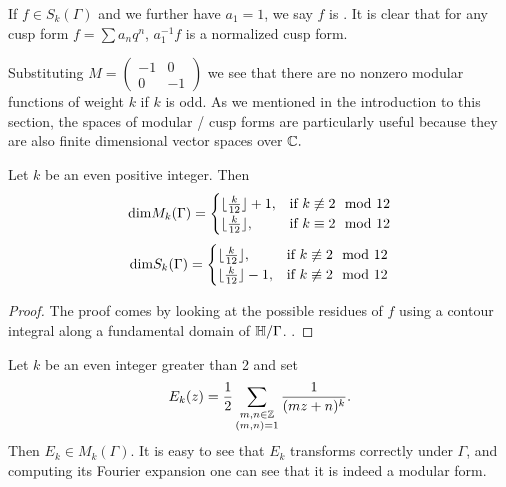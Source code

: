 \documentclass[12pt, a4paper]{report}
\begin{document}
\begin{remark}
  If $f \in S_k(\Gamma)$ and we further have $a_1 = 1$, we say $f$ is
  . It is clear that for any cusp form $f = \sum a_n q^n$,
  $a_1^{-1}f$ is a normalized cusp form.
\end{remark}

Substituting
$M = \left(
  \begin{smallmatrix}
    -1 & 0 \\ 0 & -1
  \end{smallmatrix}
\right)
$ we see that there are no
nonzero modular functions of weight $k$ if $k$ is odd.
As we mentioned in the introduction to this section, the spaces of modular /
cusp forms are particularly useful because they are also finite dimensional
vector spaces over ${\mathbb C}.$

\begin{prop}
  Let $k$ be an even positive integer. Then
  \[\textnormal{dim}M_k(\Gamma) =
    \begin{cases}
      \lfloor \frac{k}{12}  \rfloor + 1, & \text{if } k \not\equiv 2 \mod{12} \\
      \lfloor \frac{k}{12}  \rfloor, & \text{if } k \equiv 2 \mod{12} \\
    \end{cases}
\]
  \[\textnormal{dim}S_k(\Gamma) =
    \begin{cases}
      \lfloor \frac{k}{12}  \rfloor, & \text{if } k \not\equiv 2 \mod{12} \\
      \lfloor \frac{k}{12}  \rfloor - 1, & \text{if } k \not\equiv 2 \mod{12} \\
    \end{cases}
\]
\end{prop}
\begin{proof}
  The proof comes by looking at the possible residues of $f$ using a contour
  integral along a fundamental domain of $\mathbb{H} / \Gamma$.
  \cite[See][Propositions 8-9, Pages 115-118]{koblitz}. 
\end{proof}

\begin{example}
  Let $k$ be an even integer greater than 2 and set
  \[E_k(z) = \frac{1}{2} \sum_{\substack{m,n \in {\mathbb Z} \\ (m,n) =1}} \frac{1}{(mz+n)^k}.\]
  Then $E_k \in M_k(\Gamma).$ It is easy to see that $E_k$ transforms correctly
  under $\Gamma$, and computing its Fourier expansion one can see that it is
  indeed a modular form.
\end{example}
\end{document}
